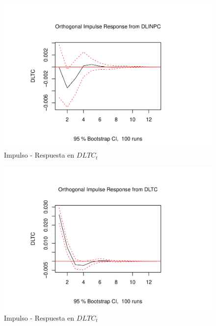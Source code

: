 \documentclass[
]{book}
\begin{document}
\begin{figure}

{\centering \includegraphics{Notas-Series-Tiempo_files/figure-latex/fig64-1} 

}

\caption{Impulso - Respuesta en $DLTC_t$}\label{fig:fig64-1}
\end{figure}
\begin{figure}

{\centering \includegraphics{Notas-Series-Tiempo_files/figure-latex/fig64-2} 

}

\caption{Impulso - Respuesta en $DLTC_t$}\label{fig:fig64-2}
\end{figure}
\end{document}
